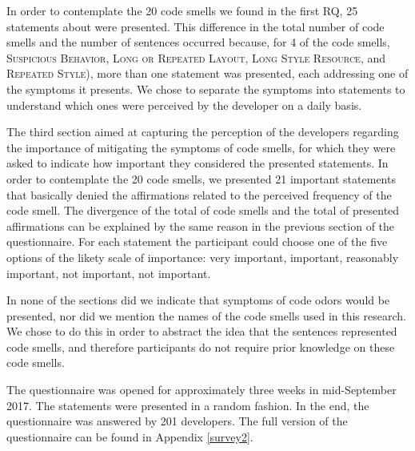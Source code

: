 In order to contemplate the 20 code smells we found in the first RQ, 25 statements about were presented. This difference in the total number of code smells and the number of sentences occurred because, for 4 of the code smells, \textsc{Suspicious Behavior}, 
\textsc{Long or Repeated Layout}, \textsc{Long Style Resource}, and \textsc{Repeated Style}), more than one statement was presented, each addressing one of the symptoms it presents. We chose to separate the symptoms into statements to understand which ones were perceived by the developer on a daily basis. 


The third section aimed at capturing the perception of the developers regarding the importance of mitigating the symptoms of code smells, for which they were asked to indicate how important they considered the presented statements. In order to contemplate the 20 code smells, we presented 21 important statements that basically denied the affirmations related to the perceived frequency of the code smell. The divergence of the total of code smells and the total of presented affirmations can be explained by the same reason in the previous section of the questionnaire. For each statement the participant could choose one of the five options of the likety scale of importance: very important, important, reasonably important, not important, not important.

In none of the sections did we indicate that symptoms of code odors would be presented, nor did we mention the names of the code smells used in this research. We chose to do this in order to abstract the idea that the sentences represented code smells, and therefore participants do not require prior knowledge on these code smells.


The questionnaire was opened for approximately three weeks in mid-September 2017. The statements were presented in a random fashion. In the end, the questionnaire was answered by 201 developers. The full version of the questionnaire can be found in Appendix \ref{survey2}.


